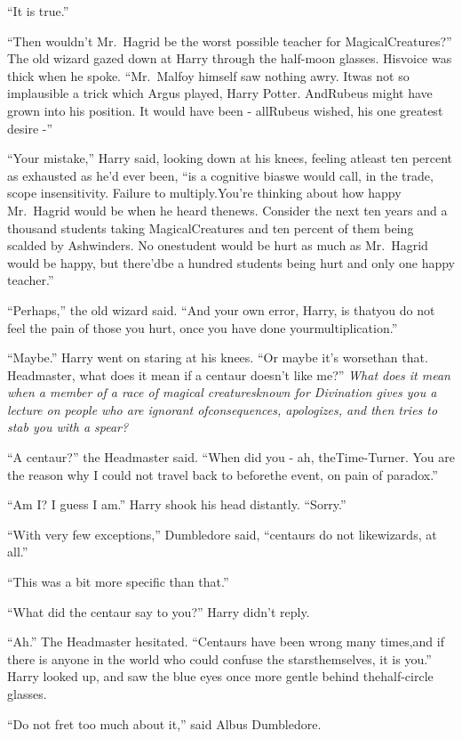 ``It is true.''

``Then wouldn't Mr.~Hagrid be the worst possible teacher for MagicalCreatures?''
The old wizard gazed down at Harry through the half-moon glasses. Hisvoice was thick when he spoke. ``Mr.~Malfoy himself saw nothing awry. Itwas not so implausible a trick which Argus played, Harry Potter. AndRubeus might have grown into his position. It would have been - allRubeus wished, his one greatest desire -''

``Your mistake,'' Harry said, looking down at his knees, feeling atleast ten percent as exhausted as he'd ever been, ``is a cognitive biaswe would call, in the trade, scope insensitivity. Failure to multiply.You're thinking about how happy Mr.~Hagrid would be when he heard thenews. Consider the next ten years and a thousand students taking MagicalCreatures and ten percent of them being scalded by Ashwinders. No onestudent would be hurt as much as Mr.~Hagrid would be happy, but there'dbe a hundred students being hurt and only one happy teacher.''

``Perhaps,'' the old wizard said. ``And your own error, Harry, is thatyou do not feel the pain of those you hurt, once you have done yourmultiplication.''

``Maybe.'' Harry went on staring at his knees. ``Or maybe it's worsethan that. Headmaster, what does it mean if a centaur doesn't like me?''
\emph{What does it mean when a member of a race of magical creaturesknown for Divination gives you a lecture on people who are ignorant ofconsequences, apologizes, and then tries to stab you with a spear?}

``A centaur?'' the Headmaster said. ``When did you - ah, theTime-Turner. You are the reason why I could not travel back to beforethe event, on pain of paradox.''

``Am I? I guess I am.'' Harry shook his head distantly. ``Sorry.''

``With very few exceptions,'' Dumbledore said, ``centaurs do not likewizards, at all.''

``This was a bit more specific than that.''

``What did the centaur say to you?''
Harry didn't reply.

``Ah.'' The Headmaster hesitated. ``Centaurs have been wrong many times,and if there is anyone in the world who could confuse the starsthemselves, it is you.''
Harry looked up, and saw the blue eyes once more gentle behind thehalf-circle glasses.

``Do not fret too much about it,'' said Albus Dumbledore.

